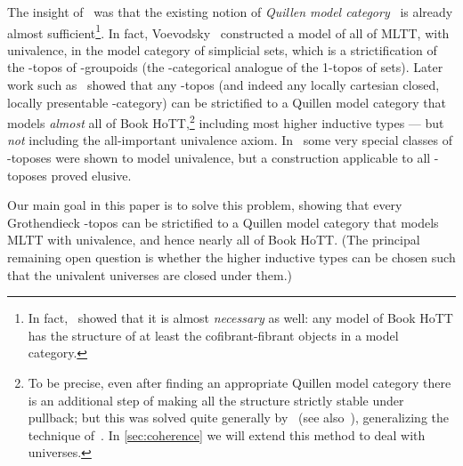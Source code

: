 The insight of~\cite{aw:htpy-idtype,klv:ssetmodel} was that the existing notion of \emph{Quillen model category}~\cite{quillen:htpical-alg} is already almost sufficient\footnote{In fact,~\cite{gg:idtypewfs,lumsdaine:hit-model-strux} showed that it is almost \emph{necessary} as well: any model of Book HoTT has the structure of at least the cofibrant-fibrant objects in a model category.}.
In fact, Voevodsky~\cite{klv:ssetmodel} constructed a model of all of MLTT, with univalence, in the model category of simplicial sets, which is a strictification of the \io-topos of \oo-groupoids (the \io-categorical analogue of the 1-topos of sets).
Later work such as~\cite{gb:topsimpid,ak:htmtt,shulman:invdia,gk:univlcc,ls:hits} showed that any \io-topos (and indeed any locally cartesian closed, locally presentable \io-category) can be strictified to a Quillen model category that models \emph{almost} all of Book HoTT,\footnote{To be precise, even after finding an appropriate Quillen model category there is an additional step of making all the structure strictly stable under pullback; but this was solved quite generally by~\cite{lw:localuniv} (see also~\cite{awodey:natmodels}), generalizing the technique of~\cite{klv:ssetmodel}.
In \cref{sec:coherence} we will extend this method to deal with universes.} including most higher inductive types --- but \emph{not} including the all-important univalence axiom.
In~\cite{shulman:invdia,shulman:elreedy,cisinski:elegant,shulman:eiuniv} some very special classes of \io-toposes were shown to model univalence, but a construction applicable to all \io-toposes proved elusive.

Our main goal in this paper is to solve this problem, showing that every Grothendieck \io-topos can be strictified to a Quillen model category that models MLTT with univalence, and hence nearly all of Book HoTT.
(The principal remaining open question is whether the higher inductive types can be chosen such that the univalent universes are closed under them.)

